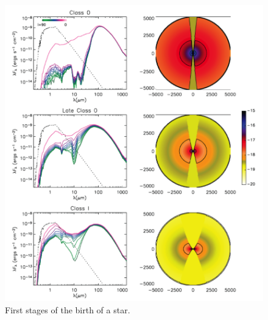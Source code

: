 \begin{figure}[!ht]
	\centering
	\includegraphics[width=\textwidth]{Figures/Whitney1.png}
	\caption[Stages 0 through I]{First stages of the birth of a star.}
	\label{fig:whitney1}
    \end{figure}
